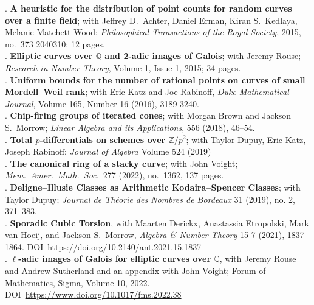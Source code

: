 \documentclass[margin,line]{res}
\newcounter{pubs}
\begin{document}
\begin{resume}
 . \textbf{A heuristic for the distribution of point counts for random   curves over a finite field}; with Jeffrey D.~Achter, Daniel Erman, Kiran S.~Kedlaya, Melanie Matchett Wood; \emph{Philosophical Transactions of the Royal Society}, 2015, no.~373 2040310; 12 pages. \vspace{.08cm}\\
 . \textbf{Elliptic curves over $\mathbb{Q}$ and 2-adic images of Galois}; with Jeremy Rouse;  \emph{Research in Number Theory}, Volume 1, Issue 1, 2015; 34 pages. \vspace{.08cm}\\
 . \textbf{Uniform bounds for the number of rational points on curves of small Mordell--Weil rank}; with Eric Katz and Joe Rabinoff, \emph{Duke Mathematical Journal}, Volume 165, Number 16 (2016), 3189-3240. \vspace{.08cm}\\
 .  \textbf{Chip-firing groups of iterated cones}; with
Morgan Brown and Jackson S.~Morrow; \emph{Linear Algebra and its Applications}, 556 (2018), 46--54. \vspace{.08cm}\\
 .  \textbf{Total $p$-differentials on schemes over $\mathbb{Z}/p^2$}; with Taylor Dupuy, Eric Katz, Joseph Rabinoff; \emph{Journal of Algebra} Volume 524 (2019) \vspace{.08cm}\\
 .  \textbf{The canonical ring of a stacky curve}; with John Voight; \emph{Mem.~Amer.~Math.~Soc.}~277 (2022), no.~1362, 137 pages. \vspace{.08cm}\\
 .  \textbf{Deligne--Illusie Classes as Arithmetic Kodaira--Spencer Classes}; with Taylor Dupuy; \emph{Journal de Th\'eorie des Nombres de Bordeaux} 31 (2019), no. 2, 371--383. \vspace{.08cm}\\
 .  \textbf{Sporadic Cubic Torsion}, with Maarten Derickx, Anastassia Etropolski, Mark van Hoeij, and Jackson S.~Morrow, \emph{Algebra \& Number Theory} 15-7 (2021), 1837--1864. DOI~\url{https://doi.org/10.2140/ant.2021.15.1837}
\vspace{.08cm}\\
 .  \textbf{$\ell$-adic images of Galois for elliptic curves over $\mathbb{Q}$}, with Jeremy Rouse and Andrew Sutherland and an appendix with John Voight; Forum of Mathematics, Sigma, Volume 10, 2022. DOI~\url{https://www.doi.org/10.1017/fms.2022.38}

\end{resume}
\end{document}
